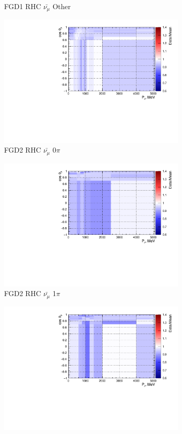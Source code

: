 \begin{figure}
\begin{subfigure}{.32\textwidth}
  \caption{FGD1 RHC $\bar{\nu_{\mu}}$ Other}
  \label{fig:priorpred_FGD1_anti-numuCC_other}
\end{subfigure}
\centering
\begin{subfigure}{.32\textwidth}
  \centering
  \includegraphics[width=0.85\linewidth]{figs/priorpred_FGD2_anti-numuCC_0pi.pdf}
  \caption{FGD2 RHC $\bar{\nu_{\mu}}$ 0$\pi$}
  \label{fig:priorpred_FGD2_anti-numuCC_0pi}
\end{subfigure}
\begin{subfigure}{.32\textwidth}
  \centering
  \includegraphics[width=0.85\linewidth]{figs/priorpred_FGD2_anti-numuCC_1pi.pdf}
  \caption{FGD2 RHC $\bar{\nu_{\mu}}$ 1$\pi$}
  \label{fig:priorpred_FGD2_anti-numuCC_1pi}
\end{subfigure}
\begin{subfigure}{.32\textwidth}
  \centering
  \includegraphics[width=0.85\linewidth]{figs/priorpred_FGD2_anti-numuCC_other.pdf}

\end{subfigure}
\end{figure}
